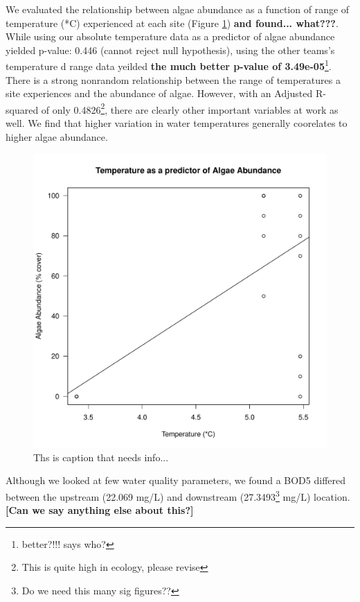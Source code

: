 \documentclass{article}\usepackage[]{graphicx}\usepackage[]{color}
\makeatletter
\def\maxwidth{ %
  \ifdim\Gin@nat@width>\linewidth
    \linewidth
  \else
    \Gin@nat@width
  \fi
}
\newenvironment{knitrout}{}{} %
\makeatother
\begin{document}
We evaluated the relationship between algae abundance as a function of range of temperature (*C) experienced at each site (Figure \ref{fig:tempalgae}) \textbf{and found... what???}. While using our absolute temperature data as a predictor of algae abundance yielded p-value: 0.446 (cannot reject null hypothesis), using the other teams's temperature d range data yeilded \textbf{the much better p-value of 3.49e-05}\footnote{better?!!! says who?}. There is a strong nonrandom relationship between the range of temperatures a site experiences and the abundance of algae. However, with an Adjusted R-squared of only 0.4826\footnote{This is quite high in ecology, please revise}, there are clearly other important variables at work as well. We find that higher variation in water temperatures generally coorelates to higher algae abundance. 
\begin{figure}[!ht]
\begin{knitrout}
\color{fgcolor}
\includegraphics[width=\maxwidth]{figure/unnamed-chunk-6-1} 

\end{knitrout}
\caption{Ths is caption that needs info...}
\label{fig:tempalgae}
\end{figure}


Although we looked at few water quality parameters, we found a BOD5 differed between the upstream (22.069 mg/L) and downstream (27.3493\footnote{Do we need this many sig figures??} mg/L) location. \textbf{[Can we say anything else about this?]}
\end{document}
